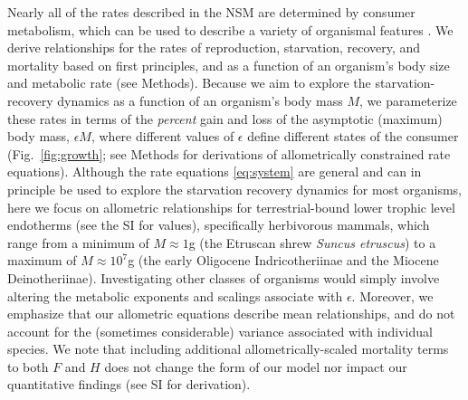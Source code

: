 \documentclass[twocolumn,preprintnumbers,amsmath,amssymb,superscriptaddress]{revtex4}
\begin{document}
Nearly all of the rates described in the NSM are determined by consumer
metabolism, which can be used to describe a variety of organismal features
\citep{Brown:2004wq}.
We derive relationships for the rates of reproduction, starvation, recovery, and mortality based on first principles, and as a function of an organism's body size and metabolic rate (see Methods).
Because we aim to explore the starvation-recovery dynamics as a function of an organism's body mass $M$, we parameterize these rates in terms of the \emph{percent} gain and loss of the asymptotic (maximum) body mass, $\epsilon M$, where different values of $\epsilon$ define different states of the consumer (Fig.~\ref{fig:growth}; see Methods for derivations of allometrically constrained rate equations).
Although the rate equations \eqref{eq:system} are general and can in
principle be used to explore the starvation recovery dynamics for most
organisms, here we focus on allometric relationships for terrestrial-bound
lower trophic level endotherms (see the SI for values), specifically herbivorous mammals, which range from a minimum of $M\approx1$g (the Etruscan shrew \emph{Suncus etruscus}) to a maximum of $M\approx10^7$g (the early Oligocene Indricotheriinae and the Miocene Deinotheriinae).
Investigating other classes of organisms would simply involve altering the metabolic exponents and scalings associate with $\epsilon$. Moreover, we emphasize that our allometric equations describe mean relationships, and do not account for the (sometimes considerable) variance associated with individual species.
{\color{red} We note that including additional allometrically-scaled mortality terms to both $F$ and $H$ does not change the form of our model nor impact our quantitative findings (see SI for derivation).}

\end{document}
